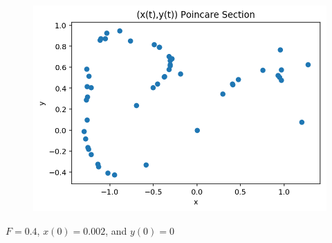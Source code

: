 \documentclass{article}
\begin{document}
\begin{figure}[h!]
\includegraphics[scale=0.4]{poincare6.png}
\end{figure}

$F = 0.4$, $x(0) = 0.002$, and $y(0) = 0$
\end{document}
